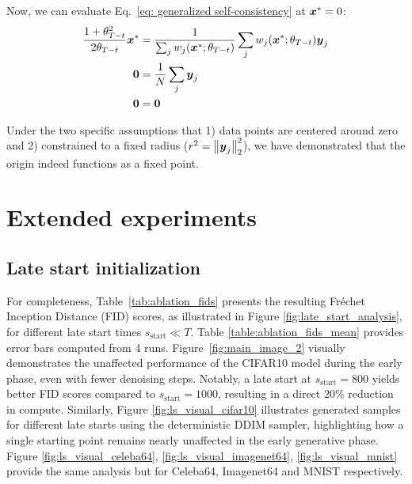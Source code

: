  Now, we  can evaluate Eq.~\ref{eq: generalized self-consistency}  at $\boldsymbol{x}^{*}=0$:
\begin{align}
    \frac{1 + \theta_{T - t}^2}{2 \theta_{T - t}} \boldsymbol{x}^* &= \frac{1}{\sum_j w_j(\boldsymbol{x}^*; \theta_{T - t})} \sum_j w_j(\boldsymbol{x}^*; \theta_{T - t}) \boldsymbol{y}_j \nonumber\\
    \boldsymbol{0}  &= \frac{1}{N} \sum_j \boldsymbol{y}_j \nonumber\\
    \boldsymbol{0}  &= \boldsymbol{0}
\end{align}

Under the two specific assumptions that 1) data points are centered around zero and 2) constrained to a fixed radius ($r^2 = {\left\lVert \boldsymbol{y}_j\right\rVert}_{2}^2$), we have demonstrated that the origin indeed functions as a fixed point.

\section{Extended experiments}
\label{supp:experiments}




\subsection{Late start initialization}
\label{supp:late_start_init}

For completeness, Table~\ref{tab:ablation_fids} presents the resulting Fréchet Inception Distance (FID) scores, as illustrated in Figure \ref{fig:late_start_analysis}, for different late start times $s_{\text{start}} \ll T$. Table \ref{table:ablation_fids_mean} provides error bars computed from 4 runs. Figure~\ref{fig:main_image_2} visually demonstrates the unaffected performance of the CIFAR10 model during the early phase, even with fewer denoising steps. Notably, a late start at $s_{\text{start}} = 800$ yields better FID scores compared to $s_{\text{start}} = 1000$, resulting in a direct $20\%$ reduction in compute. Similarly, Figure \ref{fig:ls_visual_cifar10} illustrates generated samples for different late starts using the deterministic DDIM sampler, highlighting how a single starting point remains nearly unaffected in the early generative phase. Figure \ref{fig:ls_visual_celeba64}, \ref{fig:ls_visual_imagenet64}, \ref{fig:ls_visual_mnist} provide the same analysis but for Celeba64, Imagenet64 and MNIST respectively.









